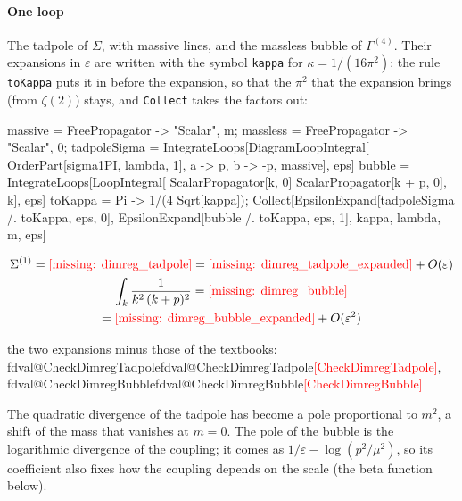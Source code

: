 \documentclass[11pt,a4paper]{article}
\makeatletter
\newcommand{\formula}[1]{\IfFileExists{figures/formula_#1.tex}{}{\text{\textcolor{red}{[missing: \detokenize{#1}]}}}}
\newcommand{\pkg}[1]{\texttt{#1}}
\newcommand{\val}[1]{\ifcsname fdval@#1\endcsname\csname fdval@#1\endcsname\else\textcolor{red}{[#1]}\fi}
\makeatother
\begin{document}
\paragraph{One loop} The tadpole of $\Sigma$, with massive lines, and the massless bubble of $\Gamma^{(4)}$. Their
expansions in $\varepsilon$ are written with the symbol \pkg{kappa} for $\kappa=1/(16\pi^2)$: the rule \pkg{toKappa} puts
it in before the expansion, so that the $\pi^2$ that the expansion brings (from $\zeta(2)$) stays, and \pkg{Collect}
takes the factors out:
\begin{code}
massive = {FreePropagator -> {"Scalar", m}};
massless = {FreePropagator -> {"Scalar", 0}};
tadpoleSigma = IntegrateLoops[DiagramLoopIntegral[
    OrderPart[sigma1PI, lambda, 1], {a -> p, b -> -p}, massive], eps]
bubble = IntegrateLoops[LoopIntegral[
    ScalarPropagator[k, 0] ScalarPropagator[k + p, 0], {k}], eps]
toKappa = Pi -> 1/(4 Sqrt[kappa]);
Collect[{EpsilonExpand[tadpoleSigma /. toKappa, eps, 0],
    EpsilonExpand[bubble /. toKappa, eps, 1]}, {kappa, lambda, m, eps}]
\end{code}
\begin{outputbox}
\vspace{-6pt}
\begin{gather*}
\Sigma^{(1)}=\formula{dimreg_tadpole}=\formula{dimreg_tadpole_expanded}+O(\varepsilon)\\
\int_k\frac{1}{k^2\,(k+p)^2}=\formula{dimreg_bubble}\\
=\formula{dimreg_bubble_expanded}+O(\varepsilon^2)
\end{gather*}
\end{outputbox}
\begin{result}
the two expansions minus those of the textbooks: \val{CheckDimregTadpole}, \val{CheckDimregBubble}
\end{result}
The quadratic divergence of the tadpole has become a pole proportional to $m^2$, a shift of the mass that vanishes at
$m=0$. The pole of the bubble is the logarithmic divergence of the coupling; it comes as $1/\varepsilon-\log(p^2/\mu^2)$,
so its coefficient also fixes how the coupling depends on the scale (the beta function below).
\end{document}
